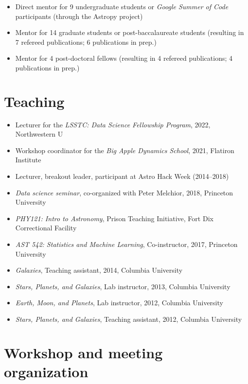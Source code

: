 \documentclass[12pt, letterpaper]{apw-cv}
\begin{document}


\begin{itemize}
    \item Direct mentor for 9 undergraduate students or \textit{Google Summer of Code} participants (through the Astropy project)
    \item Mentor for 14 graduate students or post-baccalaureate students (resulting in 7 refereed publications; 6 publications in prep.)
    \item Mentor for 4 post-doctoral fellows (resulting in 4 refereed publications; 4 publications in prep.)
\end{itemize}

\section*{Teaching}

\begin{itemize}
    \item Lecturer for the \textit{LSSTC: Data Science Fellowship Program}, 2022, Northwestern U
    \item Workshop coordinator for the \textit{Big Apple Dynamics School}, 2021, Flatiron Institute
    \item Lecturer, breakout leader, participant at Astro Hack Week (2014--2018)
    \item \emph{Data science seminar}, co-organized with Peter Melchior, 2018, Princeton University
    \item \emph{PHY121: Intro to Astronomy}, Prison Teaching Initiative, Fort Dix Correctional Facility
	\item \emph{AST 542: Statistics and Machine Learning}, Co-instructor, 2017, Princeton University
    \item \emph{Galaxies}, Teaching assistant, 2014, Columbia University
	\item \emph{Stars, Planets, and Galaxies}, Lab instructor, 2013, Columbia University
	\item \emph{Earth, Moon, and Planets}, Lab instructor, 2012, Columbia University
	\item \emph{Stars, Planets, and Galaxies}, Teaching assistant, 2012, Columbia University
\end{itemize}

\section*{Workshop and meeting organization}
\end{document}
